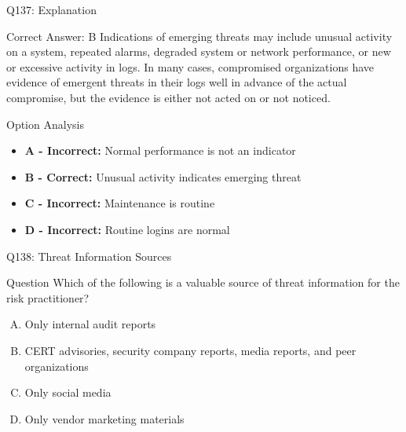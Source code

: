 \documentclass{beamer}
\begin{document}
	\begin{frame}{Q137: Explanation}
		\begin{block}{Correct Answer: B}
			Indications of emerging threats may include unusual activity on a system, repeated alarms, degraded system or network performance, or new or excessive activity in logs. In many cases, compromised organizations have evidence of emergent threats in their logs well in advance of the actual compromise, but the evidence is either not acted on or not noticed.
		\end{block}
		\begin{block}{Option Analysis}
			\begin{itemize}
				\item \textbf{A - Incorrect:} Normal performance is not an indicator
				\item \textbf{B - Correct:} Unusual activity indicates emerging threat
				\item \textbf{C - Incorrect:} Maintenance is routine
				\item \textbf{D - Incorrect:} Routine logins are normal
			\end{itemize}
		\end{block}
	\end{frame}
	
	\begin{frame}{Q138: Threat Information Sources}
		\begin{block}{Question}
			Which of the following is a valuable source of threat information for the risk practitioner?
		\end{block}
		\begin{enumerate}[(A)]
			\item Only internal audit reports
			\item CERT advisories, security company reports, media reports, and peer organizations
			\item Only social media
			\item Only vendor marketing materials
		\end{enumerate}
	\end{frame}
	
\end{document}
